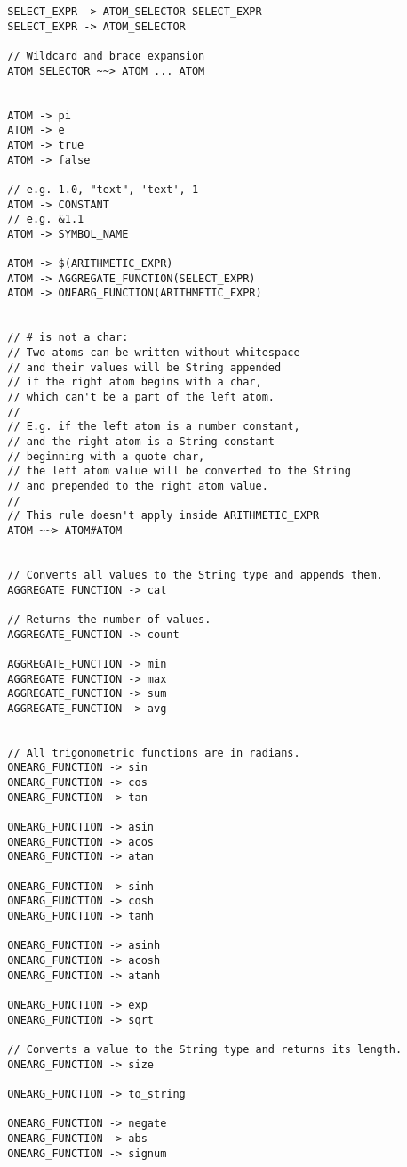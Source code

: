 \begin{verbatim}
  SELECT_EXPR -> ATOM_SELECTOR SELECT_EXPR                                                                                                                                     
  SELECT_EXPR -> ATOM_SELECTOR
  
  // Wildcard and brace expansion
  ATOM_SELECTOR ~~> ATOM ... ATOM 

  
  ATOM -> pi   
  ATOM -> e
  ATOM -> true
  ATOM -> false

  // e.g. 1.0, "text", 'text', 1
  ATOM -> CONSTANT
  // e.g. &1.1
  ATOM -> SYMBOL_NAME

  ATOM -> $(ARITHMETIC_EXPR)
  ATOM -> AGGREGATE_FUNCTION(SELECT_EXPR)
  ATOM -> ONEARG_FUNCTION(ARITHMETIC_EXPR)


  // # is not a char:
  // Two atoms can be written without whitespace
  // and their values will be String appended 
  // if the right atom begins with a char, 
  // which can't be a part of the left atom.
  //
  // E.g. if the left atom is a number constant, 
  // and the right atom is a String constant 
  // beginning with a quote char,
  // the left atom value will be converted to the String
  // and prepended to the right atom value.
  //
  // This rule doesn't apply inside ARITHMETIC_EXPR
  ATOM ~~> ATOM#ATOM     

  
  // Converts all values to the String type and appends them.
  AGGREGATE_FUNCTION -> cat

  // Returns the number of values.
  AGGREGATE_FUNCTION -> count

  AGGREGATE_FUNCTION -> min
  AGGREGATE_FUNCTION -> max
  AGGREGATE_FUNCTION -> sum
  AGGREGATE_FUNCTION -> avg

  
  // All trigonometric functions are in radians.
  ONEARG_FUNCTION -> sin
  ONEARG_FUNCTION -> cos
  ONEARG_FUNCTION -> tan
  
  ONEARG_FUNCTION -> asin
  ONEARG_FUNCTION -> acos
  ONEARG_FUNCTION -> atan
  
  ONEARG_FUNCTION -> sinh
  ONEARG_FUNCTION -> cosh
  ONEARG_FUNCTION -> tanh
  
  ONEARG_FUNCTION -> asinh
  ONEARG_FUNCTION -> acosh
  ONEARG_FUNCTION -> atanh
  
  ONEARG_FUNCTION -> exp
  ONEARG_FUNCTION -> sqrt
  
  // Converts a value to the String type and returns its length.
  ONEARG_FUNCTION -> size

  ONEARG_FUNCTION -> to_string
  
  ONEARG_FUNCTION -> negate
  ONEARG_FUNCTION -> abs
  ONEARG_FUNCTION -> signum
  

\end{verbatim}
